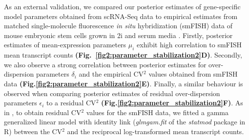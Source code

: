 As an external validation, we compared our posterior estimates of gene-specific model parameters obtained from scRNA-Seq data to empirical estimates from matched single-molecule fluorescence \textit{in situ} hybridization (smFISH) data of mouse embryonic stem cells grown in 2i and serum media \citep{Grun2014}. Firstly, posterior estimates of mean-expression parameters $\mu_i$ exhibit high correlation to smFISH mean transcript counts \textbf{(Fig.~\ref{fig2:parameter_stabilization2}D)}. Secondly, we also observe a strong correlation between posterior estimates for over-dispersion parameters $\delta_i$ and the empirical CV$^2$ values obtained from smFISH data \textbf{(Fig.\ref{fig2:parameter_stabilization2}E)}. Finally, a similar behaviour is observed when comparing posterior estimates of residual over-dispersion parameters $\epsilon_i$ to a residual CV$^2$ \textbf{(Fig.\ref{fig2:parameter_stabilization2}F)}. As in \cite{Brennecke2013}, to obtain residual CV$^2$ values for the smFISH data, we fitted a gamma generalized linear model with identity link (\textit{glmgam.fit} of the \textit{statmod} package in R) between the CV$^2$ and the reciprocal log-transformed mean transcript counts.

\newpage

